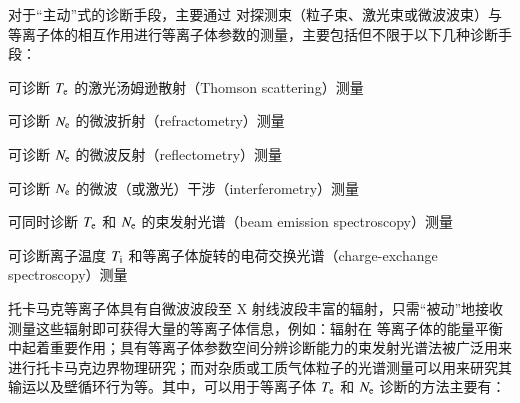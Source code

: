 对于“主动”式的诊断手段，主要通过
对探测束（粒子束、激光束或微波波束）与等离子体的相互作用进行等离子体参数的测量，主要包括但不限于以下几种诊断手段：

\hspace{0.25em}\textbullet\hspace{0.45em}可诊断 $T_{\rm e}$ 的激光汤姆逊散射（Thomson scattering）测量\cite{ThomsonScattering:1,ThomsonScattering:2,ThomsonScattering:3}

\hspace{0.25em}\textbullet\hspace{0.45em}可诊断 $N_{\rm e}$ 的微波折射（refractometry）测量\cite{refractometry}

\hspace{0.25em}\textbullet\hspace{0.45em}可诊断 $N_{\rm e}$ 的微波反射（reflectometry）测量\cite{MicrowaveReflectometry}

\hspace{0.25em}\textbullet\hspace{0.45em}可诊断 $N_{\rm e}$ 的微波\cite{MicrowaveInterferometry}（或激光\cite{LaserInterferometry}）干涉（interferometry）测量

\hspace{0.25em}\textbullet\hspace{0.45em}可同时诊断 $T_{\rm e}$ 和 $N_{\rm e}$ 的束发射光谱（beam emission spectroscopy）\cite{Li-beam,Schmitz2008}测量

\hspace{0.25em}\textbullet\hspace{0.45em}可诊断离子温度 $T_{\rm i}$ 和等离子体旋转的电荷交换光谱（charge-exchange spectroscopy）\cite{Isler:CXRS:1,Isler:CXRS:2}测量



托卡马克等离子体具有自微波波段至 X 射线波段丰富的辐射，只需“被动”地接收测量这些辐射即可获得大量的等离子体信息，例如：辐射\cite{Bolometer:DIIID:radiatedPower,Bolometer:JET:radiatedPower}在 等离子体的能量平衡中起着重要作用；具有等离子体参数空间分辨诊断能力的束发射光谱法被广泛用来进行托卡马克边界物理研究\cite{BES:PPCF:1993}；而对杂质或工质气体粒子的光谱测量可以用来研究其输运以及壁循环行为\cite{HT7:CarbonTransport,ParticleTransport:PPCF:2009}等。其中，可以用于等离子体 $T_{\rm e}$ 和 $N_{\rm e}$ 诊断的方法主要有：

